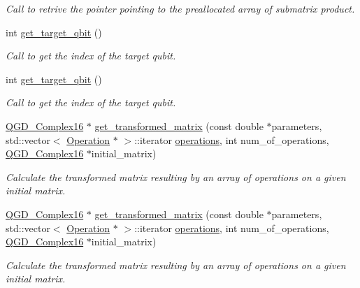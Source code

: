 \begin{DoxyCompactItemize}
\begin{DoxyCompactList}\small\item\em Call to retrive the pointer pointing to the preallocated array of submatrix product. \end{DoxyCompactList}\item 
int \hyperlink{class_operation_a55eee2ad4b90be085b1ec2ce018502f8}{get\+\_\+target\+\_\+qbit} ()
\begin{DoxyCompactList}\small\item\em Call to get the index of the target qubit. \end{DoxyCompactList}\item 
int \hyperlink{class_operation_a55eee2ad4b90be085b1ec2ce018502f8}{get\+\_\+target\+\_\+qbit} ()
\begin{DoxyCompactList}\small\item\em Call to get the index of the target qubit. \end{DoxyCompactList}\item 
\hyperlink{struct_q_g_d___complex16}{Q\+G\+D\+\_\+\+Complex16} $\ast$ \hyperlink{class_decomposition___base_a8e26f5a31475e4d5a2e9c785a2a57dd9}{get\+\_\+transformed\+\_\+matrix} (const double $\ast$parameters, std\+::vector$<$ \hyperlink{class_operation}{Operation} $\ast$ $>$\+::iterator \hyperlink{class_operation__block_a1efec4139888e591b59acd7b84497af1}{operations}, int num\+\_\+of\+\_\+operations, \hyperlink{struct_q_g_d___complex16}{Q\+G\+D\+\_\+\+Complex16} $\ast$initial\+\_\+matrix)
\begin{DoxyCompactList}\small\item\em Calculate the transformed matrix resulting by an array of operations on a given initial matrix. \end{DoxyCompactList}\item 
\hyperlink{struct_q_g_d___complex16}{Q\+G\+D\+\_\+\+Complex16} $\ast$ \hyperlink{class_decomposition___base_a74159036ee14ac2c33a0ccd45de782d5}{get\+\_\+transformed\+\_\+matrix} (const double $\ast$parameters, std\+::vector$<$ \hyperlink{class_operation}{Operation} $\ast$ $>$\+::iterator \hyperlink{class_operation__block_a1efec4139888e591b59acd7b84497af1}{operations}, int num\+\_\+of\+\_\+operations, \hyperlink{struct_q_g_d___complex16}{Q\+G\+D\+\_\+\+Complex16} $\ast$initial\+\_\+matrix)
\begin{DoxyCompactList}\small\item\em Calculate the transformed matrix resulting by an array of operations on a given initial matrix. \end{DoxyCompactList}\item 

\end{DoxyCompactItemize}
